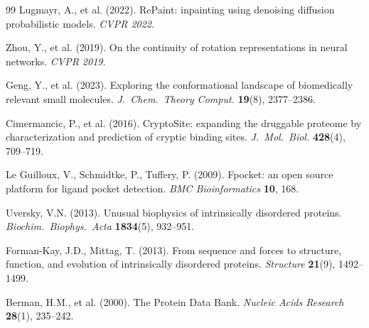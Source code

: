 \documentclass[12pt,letterpaper]{article}
\begin{document}
\begin{thebibliography}{99}
Lugmayr, A., et al. (2022).
RePaint: inpainting using denoising diffusion probabilistic models.
\textit{CVPR 2022}.

Zhou, Y., et al. (2019).
On the continuity of rotation representations in neural networks.
\textit{CVPR 2019}.

Geng, Y., et al. (2023).
Exploring the conformational landscape of biomedically relevant small molecules.
\textit{J.\ Chem.\ Theory Comput.} \textbf{19}(8), 2377--2386.

Cimermancic, P., et al. (2016).
CryptoSite: expanding the druggable proteome by characterization and prediction of cryptic binding sites.
\textit{J.\ Mol.\ Biol.} \textbf{428}(4), 709--719.

Le Guilloux, V., Schmidtke, P., Tuffery, P. (2009).
Fpocket: an open source platform for ligand pocket detection.
\textit{BMC Bioinformatics} \textbf{10}, 168.

Uversky, V.N. (2013).
Unusual biophysics of intrinsically disordered proteins.
\textit{Biochim.\ Biophys.\ Acta} \textbf{1834}(5), 932--951.

Forman-Kay, J.D., Mittag, T. (2013).
From sequence and forces to structure, function, and evolution of intrinsically disordered proteins.
\textit{Structure} \textbf{21}(9), 1492--1499.

Berman, H.M., et al. (2000).
The Protein Data Bank.
\textit{Nucleic Acids Research} \textbf{28}(1), 235--242.

\end{thebibliography}
\endgroup
\end{document}
